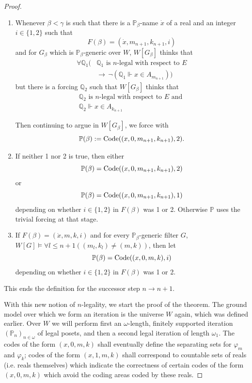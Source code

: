 \documentclass[a4paper,11pt]{article}
\newcommand{\forceP}{\mathbb{P}}
\newcommand{\forceQ}{\mathbb{Q}}
\begin{document}
\begin{proof}
\begin{enumerate}
\item
Whenever $\beta < \gamma $ is such that there is a $\forceP_{\beta}$-name $\dot{x}$ of a real and an integer $ i\in\{1,2\}$ such that
\[F(\beta)= (\dot{x},m_{n+1},k_{n+1},i)\] and for $G_{\beta}$ which is $\forceP_{\beta}$-generic over $W$, $W[G_{\beta}]$ thinks that
\begin{align*}
\forall \forceQ_1 (&\forceQ_1 \text{ is } n \text{-legal with respect to } E  \\& \rightarrow \, \lnot(\forceQ_1 \Vdash x \in A_{m_{n+1}}))
\end{align*}
but there is a forcing $\forceQ_2$ such that $W[G_{\beta}]$ thinks that 
\begin{align*}
\forceQ_{2} \text{ is } n \text{-legal with respect to $E$ and } \\   {\forceQ_2} \Vdash x \in A_{k_{n+1}}
\end{align*}


Then continuing to argue in $W[G_{\beta}]$, we force with
\[\forceP(\beta):= \hbox{Code}((x,0,m_{n+1},k_{n+1}),2).\] 




\item If neither 1 nor 2 is true, then either \[ \forceP(\beta)=\hbox{Code}((x,0,m_{n+1},k_{n+1}),2)\] or 
\[ \forceP(\beta)=\hbox{Code}((x,0,m_{n+1},k_{n+1}),1)\] depending on whether $ i\in\{1,2\}$ in $F(\beta)$ was 1 or 2. Otherwise $\forceP$ uses the trivial forcing at that stage. 

\item 
If $F(\beta) = (\dot{x},m,k,i)$ and for every $\forceP_{\beta}$-generic filter $G$, $W[G] \models \forall l \le n+1 ((m_l,k_l) \ne (m,k))$,
then let
\[ \forceP(\beta)=\hbox{Code}((x,0,m,k),i)\] depending on whether $ i\in\{1,2\}$ in $F(\beta)$ was 1 or 2.  
\end{enumerate} 
This ends the definition for the successor step $n \rightarrow n+1$.

With this new notion of $n$-legality, we start the proof of the theorem. The ground model over which we form an iteration is the universe $W$ again, which was defined earlier. Over $W$ we will perform first an $\omega$-length, finitely supported iteration $(\forceP_n)_{n \in \omega}$ of legal posets, and then a second legal iteration of length $\omega_1$. The codes of the form $(x,0,m,k)$ shall eventually define the separating sets for $\varphi_m$ and $\varphi_k$; codes of the form $(x,1,m,k)$ shall correspond to countable sets of reals  (i.e. reals themselves) which indicate the correctness of certain codes of the form $(x,0,m,k)$ which avoid the coding areas coded by these reals.


\end{proof}
\end{document}
